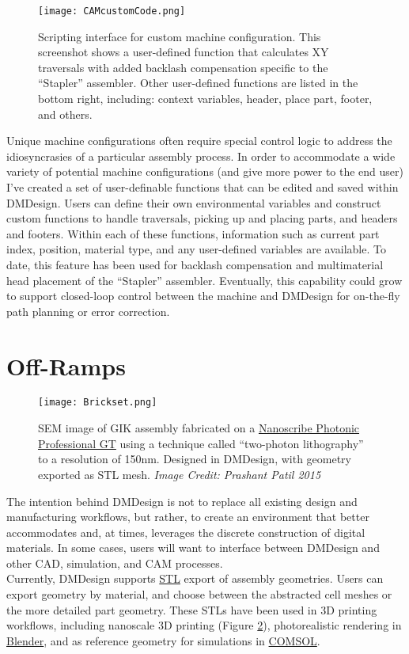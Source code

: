 {\begin{figure}
  \texttt{[image: CAMcustomCode.png]}
  \caption{Scripting interface for custom machine configuration.  This screenshot shows a user-defined function that calculates XY traversals with added backlash compensation specific to the ``Stapler'' assembler.  Other user-defined functions are listed in the bottom right, including: context variables, header, place part, footer, and others.}
  \label{fig:CAMcustomCode}
\end{figure}

Unique machine configurations often require special control logic to address the idiosyncrasies of a particular assembly process.  In order to accommodate a wide variety of potential machine configurations (and give more power to the end user) I've created a set of user-definable functions that can be edited and saved within DMDesign.  Users can define their own environmental variables and construct custom functions to handle traversals, picking up and placing parts, and headers and footers.  Within each of these functions, information such as current part index, position, material type, and any user-defined variables are available.  To date, this feature has been used for backlash compensation and multimaterial head placement of the ``Stapler'' assembler.  Eventually, this capability could grow to support closed-loop control between the machine and DMDesign for on-the-fly path planning or error correction.\\

\section{Off-Ramps}

\begin{figure}
  \texttt{[image: Brickset.png]}
  \caption{SEM image of GIK assembly fabricated on a \href{http://www.nanoscribe.de/en/products/photonic-professional-gt/}{Nanoscribe Photonic Professional GT} using a technique called ``two-photon lithography'' to a resolution of 150nm.  Designed in DMDesign, with geometry exported as STL mesh.  \textit{Image Credit: Prashant Patil 2015}}
  \label{fig:BrickSet}
\end{figure}

The intention behind DMDesign is not to replace all existing design and manufacturing workflows, but rather, to create an environment that better accommodates and, at times, leverages the discrete construction of digital materials.  In some cases, users will want to interface between DMDesign and other CAD, simulation, and CAM processes.\\

Currently, DMDesign supports \href{https://en.wikipedia.org/wiki/STL_(file_format)}{STL} export of assembly geometries.  Users can export geometry by material, and choose between the abstracted cell meshes or the more detailed part geometry.  These STLs have been used in 3D printing workflows, including nanoscale 3D printing (Figure \ref{fig:BrickSet}), photorealistic rendering in \href{https://www.blender.org/}{Blender}, and as reference geometry for simulations in \href{https://www.comsol.com/}{COMSOL}.

}
